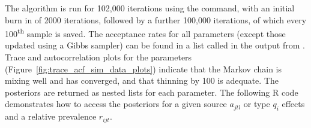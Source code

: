 \begin{knitrout}
\color{fgcolor}\begin{kframe}
\begin{alltt}
\hlstd{(}\hlstd{)}

 \hlkwb{<-} \hlstd{(} \hlstd{=} \hlstd{,}  \hlstd{=} \hlstd{,}  \hlstd{=} \hlstd{(}\hlstd{,} \hlstd{))}

 \hlkwb{<-} \hlstd{(}  \hlopt{~}  \hlopt{+}  \hlopt{+}  \hlopt{+}  \hlopt{+} 
                \hlstd{=} \hlopt{~}  \hlstd{=} \hlopt{~}  \hlstd{=} \hlopt{~}
                \hlopt{$}  
                \hlstd{=} \hlstd{,}  \hlopt{$}
                \hlstd{=} \hlstd{,}  \hlstd{=} \hlstd{,}
                \hlstd{=} \hlstd{(} \hlstd{=} \hlstd{,}  \hlstd{=} \hlstd{))}
\end{alltt}
\end{kframe}
\end{knitrout}



The algorithm is run for 102,000 iterations using the  command, with an initial burn in of 2000 iterations, followed by a further 100,000 iterations, of which every 100\textsuperscript{th} sample is saved. The acceptance rates for all parameters (except those updated using a Gibbs sampler) can be found in a list called  in the output from . Trace and autocorrelation plots for the parameters (Figure~\ref{fig:trace_acf_sim_data_plots}) indicate that the Markov chain is mixing well and has converged, and that thinning by 100 is adequate. The posteriors are returned as nested lists for each parameter. The following R code demonstrates how to access the posteriors for a given source $a_{jtl}$ or type $q_i$ effects and a relative prevalence $r_{ijt}$.

